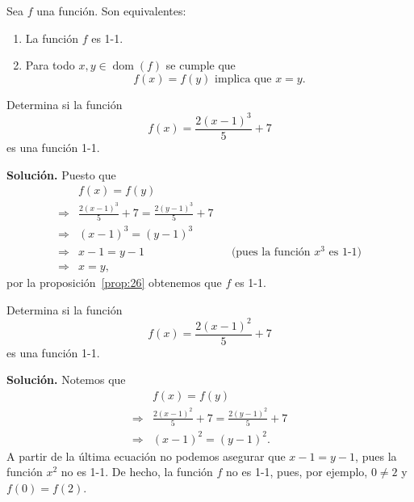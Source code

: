 \documentclass[12pt,a4paper]{book}
\DeclareMathOperator{\dom}{dom}
\begin{document}
    \begin{proposicion}\label{prop:26}
        Sea $f$ una función. Son equivalentes:
        \begin{enumerate}[nosep]
            \item La función $f$ es 1-1.
            \item Para todo $x,y\in\dom(f)$ se cumple que
            \begin{equation*}
                f(x)=f(y)\text{ implica que }x=y.
            \end{equation*}
        \end{enumerate}
    \end{proposicion}

    \begin{ejemplo}\label{ejm:38}
        Determina si la función
        \begin{equation*}
            f(x)=\frac{2(x-1)^{3}}{5}+7
        \end{equation*}
        es una función 1-1.

        \textbf{Solución.} Puesto que
        \begin{align*}
            &f(x)=f(y)\\
            \Rightarrow{}& \frac{2(x-1)^{3}}{5}+7=\frac{2(y-1)^{3}}{5}+7\\
            \Rightarrow{}& (x-1)^{3}=(y-1)^{3}\\
            \Rightarrow{}& x-1=y-1 &&\text{(pues la función $x^{3}$ es 1-1)}\\
            \Rightarrow{}& x=y,
        \end{align*}
        por la proposición~\ref{prop:26} obtenemos que $f$ es 1-1.
    \end{ejemplo}

    \begin{ejemplo}\label{ejm:39}
        Determina si la función
        \begin{equation*}
            f(x)=\frac{2(x-1)^{2}}{5}+7
        \end{equation*}
        es una función 1-1.

        \textbf{Solución.} Notemos que
        \begin{align*}
            &f(x)=f(y)\\
            \Rightarrow{}& \frac{2(x-1)^{2}}{5}+7=\frac{2(y-1)^{2}}{5}+7\\
            \Rightarrow{}& (x-1)^{2}=(y-1)^{2}.
        \end{align*}
        A partir de la última ecuación no podemos asegurar que $x-1=y-1$, pues
        la función $x^{2}$ no es 1-1. De hecho, la función $f$ no es 1-1, pues, por ejemplo,
        $0\neq 2$ y $f(0)=f(2)$.
    \end{ejemplo}
\end{document}
